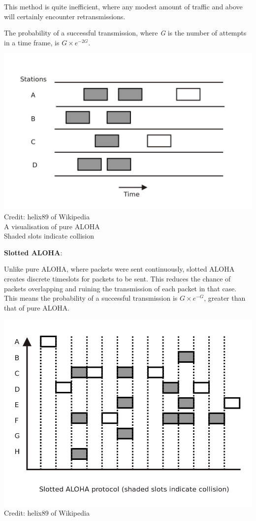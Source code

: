 \documentclass{article}
\begin{document}
This method is quite inefficient, where any modest amount of traffic and above will certainly encounter retransmissions.

The probability of a successful transmission, where \textit{G} is the number of attempts in a time frame, is $G\times e^{-2G}$.

\begin{center}
  \includegraphics[scale=0.15]{pureALOHA.png}\\
  \tiny{Credit: helix89 of Wikipedia}\\
  A visualisation of pure ALOHA\\
  Shaded slots indicate collision
\end{center}

\filbreak
\textbf{Slotted ALOHA}:

Unlike pure ALOHA, where packets were sent continuously, slotted ALOHA creates discrete timeslots for packets to be sent. This reduces the chance of packets overlapping and ruining the transmission of each packet in that case. This means the probability of a successful transmission is $G\times e^{-G}$, greater than that of pure ALOHA.

\begin{center}
  \includegraphics[scale=0.2]{slottedALOHA}\\
   \tiny{Credit: helix89 of Wikipedia}\\
\end{center}
\end{document}

